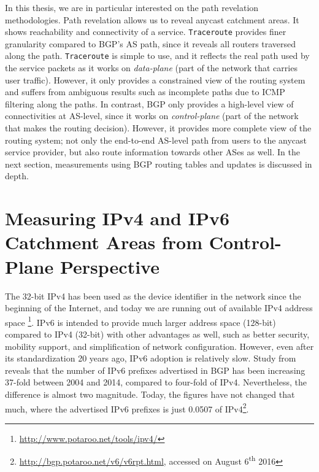 
In this thesis, we are in particular interested on the path revelation methodologies. Path revelation allows us to reveal anycast catchment areas. It shows reachability and connectivity of a service. \texttt{Traceroute} provides finer granularity compared to BGP's AS path, since it reveals all routers traversed along the path. \texttt{Traceroute} is simple to use, and it reflects the real path used by the service packets as it works on \textit{data-plane} (part of the network that carries user traffic). However, it only provides a constrained view of the routing system and suffers from ambiguous results such as incomplete paths due to ICMP filtering along the paths. In contrast, BGP only provides a high-level view of connectivities at AS-level, since it works on \textit{control-plane} (part of the network that makes the routing decision). However, it provides more complete view of the routing system; not only the end-to-end AS-level path from users to the anycast service provider, but also route information towards other ASes as well. In the next section, measurements using BGP routing tables and updates is discussed in depth.
 
\section{Measuring IPv4 and IPv6 Catchment Areas from Control-Plane Perspective}
\label{ch02:control-plane}
The 32-bit IPv4 has been used as the device identifier in the network since the beginning of the Internet, and today we are running out of available IPv4 address space \footnote{\url{http://www.potaroo.net/tools/ipv4/}}. IPv6 is intended to provide much larger address space (128-bit) compared to IPv4 (32-bit) with other advantages as well, such as better security, mobility support, and simplification of network configuration. However, even after its standardization 20 years ago, IPv6 adoption is relatively slow. Study from \cite{Czyz:2014:MIA:2619239.2626295} reveals that the number of IPv6 prefixes advertised in BGP has been increasing 37-fold between 2004 and 2014, compared to four-fold of IPv4. Nevertheless, the difference is almost two magnitude. Today, the figures have not changed that much, where the advertised IPv6 prefixes is just 0.0507 of IPv4\footnote{\url{http://bgp.potaroo.net/v6/v6rpt.html}, accessed on August 6\textsuperscript{th} 2016}.

